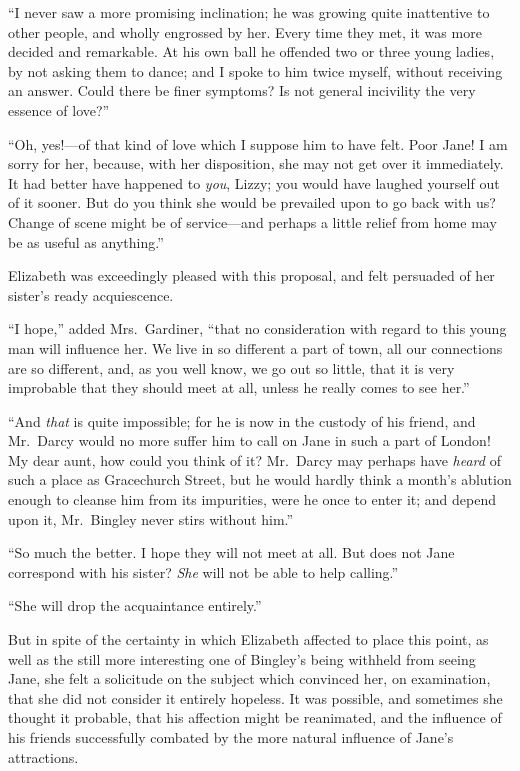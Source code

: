\documentclass[12pt,english,oneside]{book}
\begin{document}
{}``I never saw a more promising inclination; he was growing quite
inattentive to other people, and wholly engrossed by her. Every time
they met, it was more decided and remarkable. At his own ball he offended
two or three young ladies, by not asking them to dance; and I spoke
to him twice myself, without receiving an answer. Could there be finer
symptoms? Is not general incivility the very essence of love?''\ 

{}``Oh, yes!\mbox{---}of that kind of love which I suppose him to
have felt. Poor Jane! I am sorry for her, because, with her disposition,
she may not get over it immediately. It had better have happened to
\textit{you}, Lizzy; you would have laughed yourself out of it sooner.
But do you think she would be prevailed upon to go back with us? Change
of scene might be of service\mbox{---}and perhaps a little relief
from home may be as useful as anything.''

Elizabeth was exceedingly pleased with this proposal, and felt persuaded
of her sister's ready acquiescence.

{}``I hope,'' added Mrs.\ Gardiner, {}``that no consideration
with regard to this young man will influence her. We live in so different
a part of town, all our connections are so different, and, as you
well know, we go out so little, that it is very improbable that they
should meet at all, unless he really comes to see her.''

{}``And \textit{that} is quite impossible; for he is now in the custody
of his friend, and Mr.\ Darcy would no more suffer him to call on
Jane in such a part of London! My dear aunt, how could you think of
it? Mr.\ Darcy may perhaps have \textit{heard} of such a place as
Gracechurch Street, but he would hardly think a month's ablution enough
to cleanse him from its impurities, were he once to enter it; and
depend upon it, Mr.\ Bingley never stirs without him.''

{}``So much the better. I hope they will not meet at all. But does
not Jane correspond with his sister? \textit{She} will not be able
to help calling.''

{}``She will drop the acquaintance entirely.''

But in spite of the certainty in which Elizabeth affected to place
this point, as well as the still more interesting one of Bingley's
being withheld from seeing Jane, she felt a solicitude on the subject
which convinced her, on examination, that she did not consider it
entirely hopeless. It was possible, and sometimes she thought it probable,
that his affection might be reanimated, and the influence of his friends
successfully combated by the more natural influence of Jane's attractions.
\end{document}
